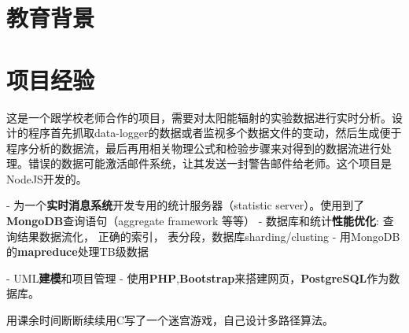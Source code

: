 \documentclass[11pt,a4paper]{moderncv}
\begin{document}
\maketitle

\section{教育背景}


\section{项目经验}

{
这是一个跟学校老师合作的项目，需要对太阳能辐射的实验数据进行实时分析。设计的程序首先抓取data-logger的数据或者监视多个数据文件的变动，然后生成便于程序分析的数据流，最后再用相关物理公式和检验步骤来对得到的数据流进行处理。错误的数据可能激活邮件系统，让其发送一封警告邮件给老师。这个项目是NodeJS开发的。
}

\vspace*{0.2\baselineskip}
{
- 为一个\textbf{实时消息系统}开发专用的统计服务器（statistic server）。使用到了\textbf{MongoDB}查询语句（aggregate framework 等等）\newline
- 数据库和统计\textbf{性能优化}: 查询结果数据流化， 正确的索引， 表分段，数据库sharding/clusting\newline
- 用MongoDB的\textbf{mapreduce}处理TB级数据
}

\vspace*{0.2\baselineskip}
{
- UML\textbf{建模}和项目管理\newline
- 使用\textbf{PHP},\textbf{Bootstrap}来搭建网页，\textbf{PostgreSQL}作为数据库。
}

\vspace*{0.2\baselineskip}
{用课余时间断断续续用C写了一个迷宫游戏，自己设计多路径算法。}
\end{document}
